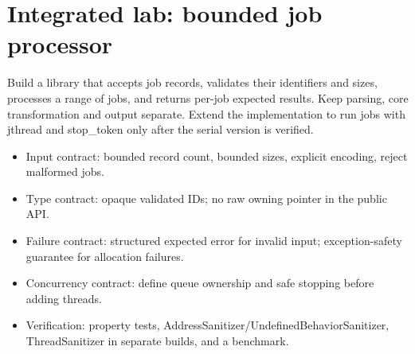 \documentclass[11pt]{article}
\begin{document}
\section{Integrated lab: bounded job processor}
Build a library that accepts job records, validates their identifiers and sizes, processes a range of jobs, and returns per-job expected results. Keep parsing, core transformation and output separate. Extend the implementation to run jobs with jthread and stop\_token only after the serial version is verified.

\begin{itemize}[leftmargin=*,itemsep=1pt,topsep=3pt]
\item Input contract: bounded record count, bounded sizes, explicit encoding, reject malformed jobs.
\item Type contract: opaque validated IDs; no raw owning pointer in the public API.
\item Failure contract: structured expected error for invalid input; exception-safety guarantee for allocation failures.
\item Concurrency contract: define queue ownership and safe stopping before adding threads.
\item Verification: property tests, AddressSanitizer/UndefinedBehaviorSanitizer, ThreadSanitizer in separate builds, and a benchmark.
\end{itemize}
\docend
\end{document}
